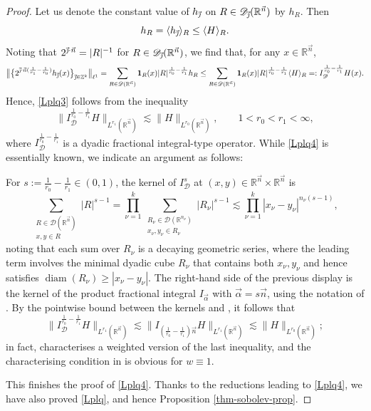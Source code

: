 \documentclass[11pt, reqno]{amsart}
\theoremstyle{definition}
\theoremstyle{remark}
\numberwithin{equation}{section}
\newcommand{\R}{\mathbb R}
\newcommand{\Z}{\mathbb Z}
\newcommand{\vj}{\vec{\textit{\j}}}
\newcommand{\vn}{\vec n}
\newcommand{\one}{\mathbf{1}}
\newcommand{\ave}[1]{\langle #1\rangle}
\newcommand{\abs}[1]{|#1|}
\newcommand{\Norm}[2]{\|#1\|_{#2}}
\newcommand{\bNorm}[2]{\big\|#1\big\|_{#2}}
\begin{document}
\begin{proof}
Let us denote the constant value of $h_{\vj}$ on $R\in\mathscr D_{\vj}(\R^{\vn})$ by $h_R$. Then
\begin{equation*}
  h_R=\ave{h_{\vj}}_R\leq\ave{H}_R.
\end{equation*}
Noting that $2^{\vj\cdot\vn}=\abs{R}^{-1}$ for $R\in\mathscr D_{\vj}(\R^{\vn})$, we find that,
for any $x\in\R^{\vn}$,
\begin{equation*}
  \bNorm{\big\{ 2^{\vj\cdot\vn(\frac{1}{r_1}-\frac{1}{r_0})} h_{\vj}(x) \big\}_{\vj\in\Z^k} }{\ell^1}
  =\sum_{R\in\mathscr D(\R^{\vn})}\one_R(x)\abs{R}^{\frac{1}{r_0}-\frac{1}{r_1}}h_R
  \leq\sum_{R\in\mathscr D(\R^{\vn})}\one_R(x)\abs{R}^{\frac{1}{r_0}-\frac{1}{r_1}}\ave{H}_R
  =:I_{\mathscr D}^{\frac{1}{r_0}-\frac{1}{r_1}}H(x).
\end{equation*}
Hence, \eqref{Lplq3} follows from the inequality
\begin{equation}\label{Lplq4}
   \Norm{ I_{\mathscr D}^{\frac{1}{r_0}-\frac{1}{r_1}}H }{L^{r_1}(\R^{\vn})}
   \lesssim \Norm{H}{L^{r_0}(\R^{\vn})},\qquad 1<r_0<r_1<\infty,
\end{equation}
where $I_{\mathscr D}^{\frac{1}{r_0}-\frac{1}{r_1}}$ is a dyadic fractional integral-type operator.
While \eqref{Lplq4} is essentially known, we indicate an argument as follows:

For $s:=\frac{1}{r_0}-\frac{1}{r_1}\in(0,1)$,
the kernel of $I_{\mathscr D}^s$ at $(x,y)\in\R^{\vn}\times\R^{\vn}$ is
\begin{equation*}
  \sum_{\substack{R\in\mathscr D(\R^{\vn}) \\ x,y\in R}}\abs{R}^{s-1}
  =\prod_{\nu=1}^k\sum_{\substack{R_\nu\in\mathscr D(\R^{n_\nu}) \\ x_\nu,y_\nu\in R_\nu}}
     \abs{R_\nu}^{s-1}
  \lesssim\prod_{\nu=1}^k\abs{x_\nu-y_\nu}^{n_\nu(s-1)},
\end{equation*}
noting that each sum over $R_\nu$ is a decaying geometric series, where the leading term involves the minimal dyadic cube $R_\nu$ that contains both $x_\nu,y_\nu$ and hence satisfies $\operatorname{diam}(R_\nu)\geq\abs{x_\nu-y_\nu}$. The right-hand side of the previous display is the kernel of the product fractional integral $I_{\vec\alpha}$ with $\vec\alpha=s\vn$, using the notation of \cite[p.~2]{Tanaka}. By the pointwise bound between the kernels and \cite[Corollary 1.2]{Tanaka}, it follows that
\begin{equation*}
  \Norm{I^{\frac{1}{r_0}-\frac{1}{r_1}}_{\mathscr D}H}{L^{r_1}(\R^{\vn})}
  \lesssim\Norm{I_{(\frac{1}{r_0}-\frac{1}{r_1})\vn}H}{L^{r_1}(\R^{\vn})}
  \lesssim\Norm{H}{L^{r_0}(\R^{\vn})};
\end{equation*}
in fact, \cite[Corollary 1.2]{Tanaka} characterises a weighted version of the last inequality, and the characterising condition in \cite[Corollary 1.2(b)]{Tanaka} is obvious for $w\equiv 1$.

This finishes the proof of \eqref{Lplq4}. Thanks to the reductions leading to \eqref{Lplq4}, we have also proved \eqref{Lplq},
and hence Proposition \ref{thm-sobolev-prop}.
\end{proof}
\end{document}
